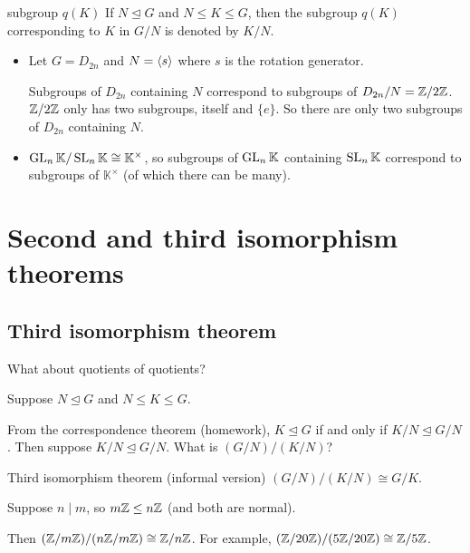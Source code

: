 \documentclass[12pt,letterpaper]{report}
\begin{document}
\begin{defn}{subgroup $q(K)$}{}
  If $N \trianglelefteq G$ and $N \leq K \leq G$, then the subgroup $q(K)$ corresponding to $K$ in
  $G/N$ is denoted by $K/N$.
\end{defn}

\begin{ex}
  \begin{itemize}
    \item Let $G = D_{2n}$ and $N = \langle s\rangle$ where $s$ is the rotation generator.

    Subgroups of $D_{2n}$ containing $N$ correspond to subgroups of $D_{2n}/N = \mathbb{Z}/{2}\mathbb{Z}$.
    $\mathbb{Z}/{2}\mathbb{Z}$ only has two subgroups, itself and $\{e\}$.
    So there are only two subgroups of $D_{2n}$ containing $N$.
    \item
    $\operatorname{GL}_n\mathbb{K}/\operatorname{SL}_n\mathbb{K} \cong \mathbb{K}^\times$, so subgroups of $\operatorname{GL}_n\mathbb{K}$
    containing $\operatorname{SL}_n\mathbb{K}$ correspond to subgroups of $\mathbb{K}^\times$ (of which there
    can be many).
  \end{itemize}
\end{ex}

\section{Second and third isomorphism theorems}

\subsection{Third isomorphism theorem}

What about quotients of quotients?

Suppose $N \trianglelefteq G$ and $N \leq K \leq G$.

From the correspondence theorem (homework), $K \trianglelefteq G$ if and only if
$K/N \trianglelefteq G/N$.
Then suppose $K/N \trianglelefteq G/N$.
What is $(G/N)/(K/N)$?

\begin{thm}{Third isomorphism theorem (informal version)}{}
  $(G/N)/(K/N) \cong G/K$.
\end{thm}

\begin{ex}
  Suppose $n \mid m$, so $m\mathbb{Z} \leq n\mathbb{Z}$ (and both are normal).

  Then $(\mathbb{Z}/m\mathbb{Z})/(n\mathbb{Z}/m\mathbb{Z}) \cong \mathbb{Z}/n\mathbb{Z}$.
  For example, $(\mathbb{Z}/20\mathbb{Z})/(5\mathbb{Z}/20\mathbb{Z}) \cong \mathbb{Z}/5\mathbb{Z}$.
\end{ex}
\end{document}

